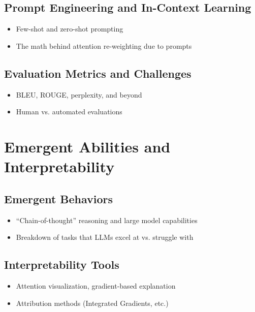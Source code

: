 \documentclass[12pt]{book}
\begin{document}
\section{Prompt Engineering and In-Context Learning}
\begin{itemize}
    \item Few-shot and zero-shot prompting
    \item The math behind attention re-weighting due to prompts
\end{itemize}

\section{Evaluation Metrics and Challenges}
\begin{itemize}
    \item BLEU, ROUGE, perplexity, and beyond
    \item Human vs. automated evaluations
\end{itemize}


\chapter{Emergent Abilities and Interpretability}
\section{Emergent Behaviors}
\begin{itemize}
    \item “Chain-of-thought” reasoning and large model capabilities
    \item Breakdown of tasks that LLMs excel at vs. struggle with
\end{itemize}

\section{Interpretability Tools}
\begin{itemize}
    \item Attention visualization, gradient-based explanation
    \item Attribution methods (Integrated Gradients, etc.)
\end{itemize}
\end{document}
